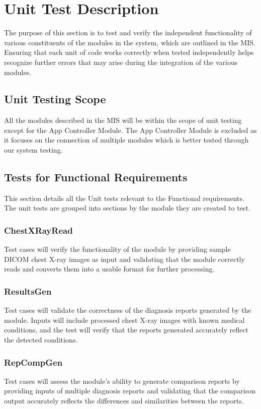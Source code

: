 \documentclass[12pt, titlepage]{article}
\begin{document}
\section{Unit Test Description}
The purpose of this section is to test and verify the independent functionality of various constituents of the modules in the system, which are outlined in the MIS. Ensuring that each unit of code works correctly when tested independently helps recognize further errors that may arise during the integration of the various modules.

\subsection{Unit Testing Scope}
All the modules described in the MIS will be within the scope of unit testing except for the App Controller Module. The App Controller Module is excluded as it focuses on the connection of multiple modules which is better tested through our system testing. 

\subsection{Tests for Functional Requirements}
This section details all the Unit tests relevant to the Functional requirements. The unit tests are grouped into sections by the module they are created to test.  

\subsubsection{ChestXRayRead}
Test cases will verify the functionality of the module by providing sample DICOM chest X-ray images as input and validating that the module correctly reads and converts them into a usable format for further processing.

\subsubsection{ResultsGen}
Test cases will validate the correctness of the diagnosis reports generated by the module. Inputs will include processed chest X-ray images with known medical conditions, and the test will verify that the reports generated accurately reflect the detected conditions.

\subsubsection{RepCompGen}
Test cases will assess the module's ability to generate comparison reports by providing inputs of multiple diagnosis reports and validating that the comparison output accurately reflects the differences and similarities between the reports.
\end{document}
